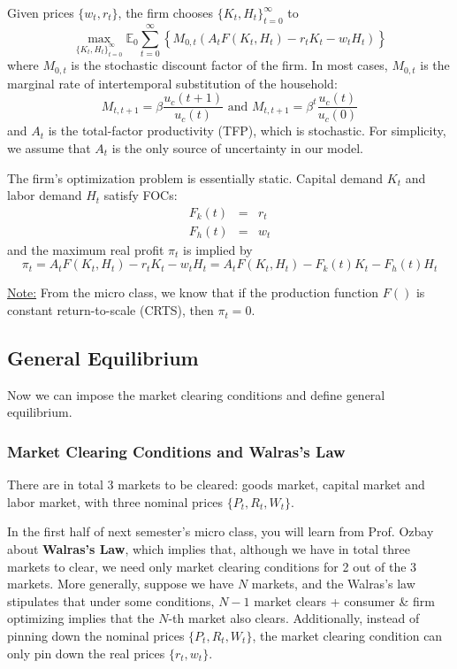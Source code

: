 \documentclass[12pt]{article}
\begin{document}
Given prices $\{w_t, r_t\}$, the firm chooses $\{K_t, H_t\}_{t=0}^\infty$ to 
\begin{equation}
	\max_{\{K_t, H_t\}_{t=0}^\infty} \mathbb{E}_0 \sum_{t=0}^\infty \left\{M_{0,t} (A_t F(K_t, H_t) - r_t K_t - w_t H_t) \right\}
\end{equation}
where $M_{0,t}$ is the stochastic discount factor of the firm. In most cases, $M_{0,t}$ is the marginal rate of intertemporal substitution of the household:
\[M_{t,t+1} = \beta \frac{u_c(t+1)}{u_c(t)} \text{ and } M_{t,t+1} = \beta^t \frac{u_c(t)}{u_c(0)}\]
and $A_t$ is the total-factor productivity (TFP), which is stochastic. For simplicity, we assume that $A_t$ is the only source of uncertainty in our model. 

The firm's optimization problem is essentially static. Capital demand $K_t$ and labor demand $H_t$ satisfy FOCs:
\begin{eqnarray}
	F_k(t) &=& r_t \label{eq:firm_r}\\ 
	F_h(t) &=& w_t \label{eq:firm_w}
\end{eqnarray}
and the maximum real profit $\pi_t$ is implied by
\begin{equation}
	\pi_t = A_t F(K_t, H_t) - r_t K_t - w_t H_t = A_t F(K_t, H_t) - F_k(t) K_t - F_h(t) H_t \label{eq:firm_pi}
\end{equation}

\underline{Note:} From the micro class, we know that if the production function $F()$ is constant return-to-scale (CRTS), then $\pi_t = 0$.

\subsection{General Equilibrium} 
Now we can impose the market clearing conditions and define general equilibrium. 

\subsubsection{Market Clearing Conditions and Walras's Law} 

There are in total 3 markets to be cleared: goods market, capital market and labor market, with three nominal prices $\{P_t, R_t, W_t\}$.

In the first half of next semester's micro class, you will learn from Prof. Ozbay about \textbf{Walras's Law}, which implies that, although we have in total three markets to clear, we need only market clearing conditions for 2 out of the 3 markets. More generally, suppose we have $N$ markets, and the Walras's law stipulates that under some conditions, $N-1$ market clears + consumer \& firm optimizing implies that the $N$-th market also clears. Additionally, instead of pinning down the nominal prices $\{P_t, R_t, W_t\}$, the market clearing condition can only pin down the real prices $\{r_t, w_t\}$. 
\end{document}
